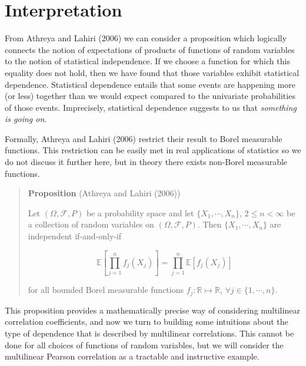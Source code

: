 \documentclass[
  letterpaper,
  DIV=11,
  numbers=noendperiod]{scrreprt}
\begin{document}
\section{Interpretation}\label{interpretation}

From Athreya and Lahiri (2006) we can consider a proposition which
logically connects the notion of expectations of products of functions
of random variables to the notion of statistical independence. If we
choose a function for which this equality does not hold, then we have
found that those variables exhibit statistical dependence. Statistical
dependence entails that some events are happening more (or less)
together than we would expect compared to the univariate probabilities
of those events. Imprecisely, statistical dependence suggests to us that
\emph{something is going on}.

\begin{tcolorbox}[enhanced jigsaw, colframe=quarto-callout-note-color-frame, toptitle=1mm, bottomtitle=1mm, breakable, colbacktitle=quarto-callout-note-color!10!white, arc=.35mm, coltitle=black, opacitybacktitle=0.6, opacityback=0, leftrule=.75mm, titlerule=0mm, title=\textcolor{quarto-callout-note-color}{\faInfo}\hspace{0.5em}{Note}, rightrule=.15mm, toprule=.15mm, colback=white, bottomrule=.15mm, left=2mm]

Formally, Athreya and Lahiri (2006) restrict their result to Borel
measurable functions. This restriction can be easily met in real
applications of statistics so we do not discuss it further here, but in
theory there exists non-Borel measurable functions.

\end{tcolorbox}

\begin{quote}
\textbf{Proposition} (Athreya and Lahiri (2006))

Let \((\Omega, \mathcal{F}, P)\) be a probability space and let
\(\{ X_1, \cdots, X_n \}\), \(2 \leq n < \infty\) be a collection of
random variables on \((\Omega, \mathcal{F}, P)\). Then
\(\{ X_1, \cdots, X_n \}\) are independent if-and-only-if

\[\mathbb{E}\left[ \prod_{j=1}^n f_j(X_j) \right] = \prod_{j=1}^n \mathbb{E} \left[ f_j(X_j)  \right]\]

for all bounded Borel measurable functions
\(f_j : \mathbb{R} \mapsto \mathbb{R}\),
\(\forall j \in \{1, \cdots, n \}\).
\end{quote}

This proposition provides a mathematically precise way of considering
multilinear correlation coefficients, and now we turn to building some
intuitions about the type of dependence that is described by multilinear
correlations. This cannot be done for all choices of functions of random
variables, but we will consider the multilinear Pearson correlation as a
tractable and instructive example.
\end{document}
